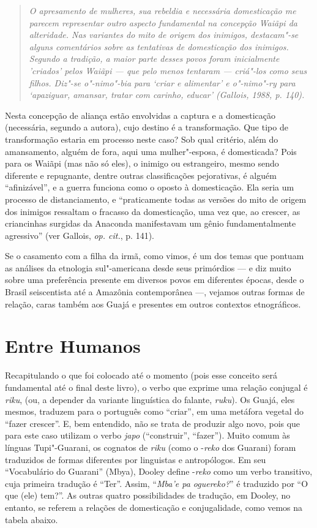 \begin{quote}
\emph{O apresamento de mulheres, sua rebeldia e necessária domesticação me
parecem representar outro aspecto fundamental na concepção Waiãpi da
alteridade. Nas variantes do mito de origem dos inimigos, destacam"-se
alguns comentários sobre as tentativas de domesticação dos inimigos.
Segundo a tradição, a maior parte desses povos foram inicialmente
'criados' pelos Waiãpi --- que pelo menos tentaram --- criá"-los como seus
filhos. Diz"-se \emph{o"-nimo"-bia} para `criar e alimentar' e
\emph{o"-nimo"-ry} para `apaziguar, amansar, tratar com carinho, educar'
(Gallois, 1988, p. 140).}
\end{quote}

Nesta concepção de aliança estão envolvidas a captura e a domesticação
(necessária, segundo a autora), cujo destino é a transformação. Que tipo
de transformação estaria em processo neste caso? Sob qual critério, além
do amansamento, alguém de fora, aqui uma mulher"-esposa, é domesticada?
Pois para os Waiãpi (mas não só eles), o inimigo ou estrangeiro, mesmo
sendo diferente e repugnante, dentre outras classificações pejorativas,
é alguém ``afinizável'', e a guerra funciona como o oposto à domesticação.
Ela seria um processo de distanciamento, e ``praticamente todas as
versões do mito de origem dos inimigos ressaltam o fracasso da
domesticação, uma vez que, ao crescer, as criancinhas surgidas da
Anaconda manifestavam um gênio fundamentalmente agressivo'' (ver
Gallois, \emph{op. cit.}, p. 141).

Se o casamento com a filha da irmã, como vimos, é um dos temas que
pontuam as análises da etnologia sul"-americana desde seus primórdios --- e
diz muito sobre uma preferência presente em diversos povos em diferentes
épocas, desde o Brasil seiscentista até a Amazônia contemporânea ---,
vejamos outras formas de relação, caras também aos Guajá e presentes em
outros contextos etnográficos.

\section{Entre Humanos}\label{entre-humanos}

Recapitulando o que foi colocado até o momento (pois esse conceito será
fundamental até o final deste livro), o verbo que exprime uma relação
conjugal é \emph{riku}, (ou, a depender da variante linguística do
falante, \emph{ruku}). Os Guajá, eles mesmos, traduzem para o português
como ``criar'', em uma metáfora vegetal do ``fazer crescer''. E, bem
entendido, não se trata de produzir algo novo, pois que para este caso
utilizam o verbo \emph{japo} (``construir'', ``fazer''). Muito comum às
línguas Tupi"-Guarani, os cognatos de \emph{riku} (como o -\emph{reko}
dos Guarani) foram traduzidos de formas diferentes por linguistas e
antropólogos. Em seu ``Vocabulário do Guarani'' (Mbya), Dooley define
-\emph{reko} como um verbo transitivo, cuja primeira tradução é ``Ter''.
Assim, ``\emph{Mba'e pa oguereko?}'' é traduzido por ``O que (ele) tem?''.
As outras quatro possibilidades de tradução, em Dooley, no entanto, se
referem a relações de domesticação e conjugalidade, como vemos na tabela
abaixo.

